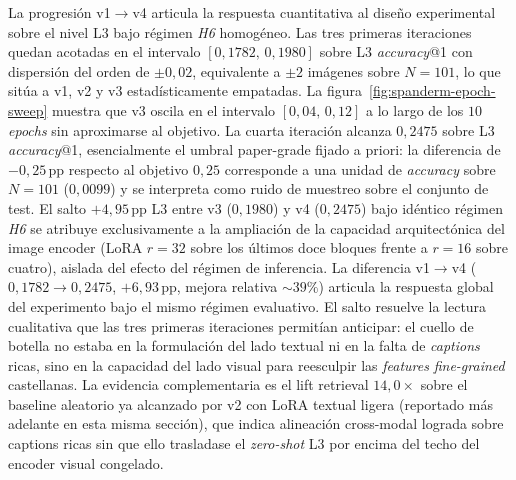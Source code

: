 La progresión v1$\to$v4 articula la respuesta cuantitativa al
diseño experimental sobre el nivel L3 bajo régimen \emph{H6}
homogéneo. Las tres primeras iteraciones quedan acotadas en el
intervalo $[0{,}1782,\,0{,}1980]$ sobre L3 \emph{accuracy}@1 con
dispersión del orden de $\pm 0{,}02$, equivalente a $\pm 2$
imágenes sobre $N = 101$, lo que sitúa a v1, v2 y v3
estadísticamente empatadas. La
figura~\ref{fig:spanderm-epoch-sweep} muestra que v3 oscila en el
intervalo $[0{,}04,\,0{,}12]$ a lo largo de los $10$ \emph{epochs}
sin aproximarse al objetivo. La cuarta iteración alcanza
$0{,}2475$ sobre L3 \emph{accuracy}@1, esencialmente el umbral
paper-grade fijado a priori: la diferencia de $-0{,}25$\,pp
respecto al objetivo $0{,}25$ corresponde a una unidad de
\emph{accuracy} sobre $N = 101$ ($0{,}0099$) y se interpreta como
ruido de muestreo sobre el conjunto de test. El salto $+4{,}95$\,pp
L3 entre v3 ($0{,}1980$) y v4 ($0{,}2475$) bajo idéntico régimen
\emph{H6} se atribuye exclusivamente a la ampliación de la
capacidad arquitectónica del image encoder (LoRA $r=32$ sobre los
últimos doce bloques frente a $r=16$ sobre cuatro), aislada del
efecto del régimen de inferencia. La diferencia v1$\to$v4
($0{,}1782 \to 0{,}2475$, $+6{,}93$\,pp, mejora relativa $\sim 39\%$)
articula la respuesta global del experimento bajo el mismo
régimen evaluativo. El salto resuelve la lectura cualitativa
que las tres primeras iteraciones permitían anticipar: el cuello
de botella no estaba en la formulación del lado textual ni en la
falta de \emph{captions} ricas, sino en la capacidad del lado
visual para reesculpir las \emph{features} \emph{fine-grained}
castellanas. La evidencia complementaria es el lift retrieval
$14{,}0\times$ sobre el baseline aleatorio ya alcanzado por v2
con LoRA textual ligera
(reportado más adelante en esta misma sección), que indica
alineación cross-modal lograda sobre captions ricas sin que ello
trasladase el \emph{zero-shot} L3 por encima del techo del
encoder visual congelado.

